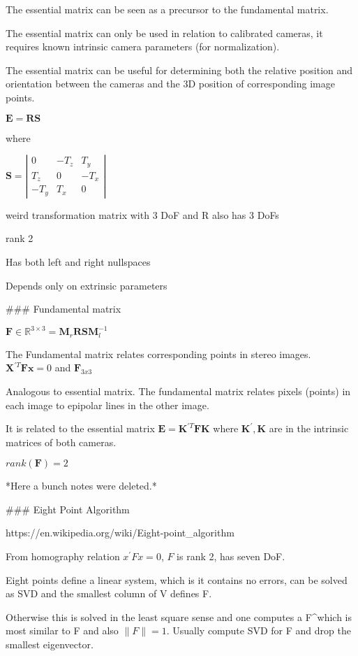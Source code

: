 The essential matrix can be seen as a precursor to the fundamental matrix. 

The essential matrix can only be used in relation to calibrated cameras, it requires known intrinsic camera parameters (for normalization).

The essential matrix can be useful for determining both the relative position and orientation between the cameras and the 3D position of corresponding image points.

$\mathbf{E}=\mathbf{RS}$

where 

$\mathbf{S} = \left| \begin{matrix} 0 & -T_z & T_y \\ T_z & 0 & -T_x \\ -T_y & T_x & 0  \end{matrix} \right|$

weird transformation matrix with 3 DoF and R also has 3 DoFs

rank 2 

Has both left and right nullspaces

Depends only on extrinsic parameters

### Fundamental matrix

$\mathbf F \in \mathbb{R}^{3\times3} = \mathbf{M}_r\mathbf{RSM}_l^{-1}$ 

The Fundamental matrix relates corresponding points in stereo images.
$\mathbf{X}^{\prime T}\mathbf{Fx}=0$ and $\mathbf{F}_{3x3}$

Analogous to essential matrix. The fundamental matrix relates pixels (points) in each image to epipolar lines in the other image.

It is related to the essential matrix $\mathbf{E} = \mathbf{K}^{\prime T} \mathbf{FK}$ where $\mathbf{K}^{\prime}, \mathbf{K}$ are in the intrinsic matrices of both cameras.

$rank(\mathbf{F}) = 2$

*Here a bunch notes were deleted.*


### Eight Point Algorithm

https://en.wikipedia.org/wiki/Eight-point_algorithm

From homography relation $x^\prime F x = 0$, $F$ is rank 2, has seven DoF. 

Eight points define a linear system, which is it contains no errors, can be solved as SVD and the smallest column of V defines F.

Otherwise this is solved in the least square sense and one computes a F^\prime which is most similar to F and also $\|F\|=1$. Usually compute SVD for F and drop the smallest eigenvector. 

